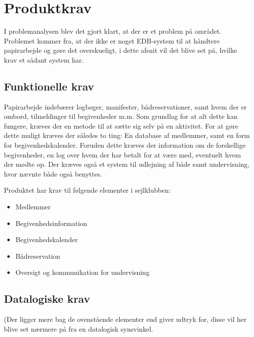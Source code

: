 \chapter{Produktkrav}

I problemanalysen blev det gjort klart, at der er et problem på området. Problemet kommer fra, at der ikke er noget EDB-system  til at håndtere papirarbejde og gøre det overskueligt, i dette afsnit vil det
blive set på, hvilke krav et sådant system har.


\section{Funktionelle krav} \label{sec:funktionelleKrav}

Papirarbejde indebærer logbøger, manifester, bådreservationer, samt hvem der er ombord, tilmeldinger til
begivenheder m.m. Som grundlag for at alt dette kan fungere, kræves der en metode til at sætte sig selv på en
aktivitet. For at gøre dette muligt kræves der således to ting: En database af medlemmer, samt en form for
begivenhedskalender. Foruden dette kræves der information om de forskellige begivenheder, en log over hvem der
har betalt for at være med, eventuelt hvem der mødte op. Der kræves også et system til udlejning af både samt
undervisning, hvor nævnte både også benyttes.

Produktet har krav til følgende elementer i sejlklubben:
\begin{itemize}
  \item Medlemmer
  \item Begivenhedsinformation
  \item Begivenhedskalender
  \item Bådreservation
  \item Oversigt og kommunikation for undervisning
\end{itemize}



\section{Datalogiske krav}

(Der ligger mere bag de ovenstående elementer end  giver udtryk for, disse vil her
blive set nærmere på fra en datalogisk synsvinkel.


